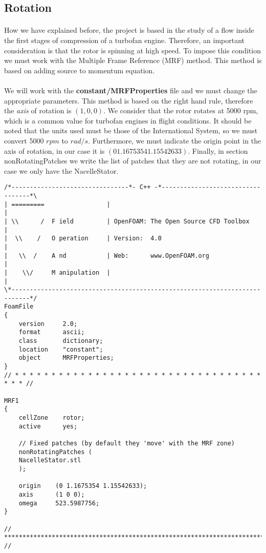 \subsection{Rotation}
\paragraph{}
How we have explained before, the project is based in the study of a flow inside the first stages of compression of a turbofan engine. Therefore, an important consideration is that the rotor is spinning at high speed. To impose this condition we must work with the Multiple Frame Reference (MRF) method. This method is based on adding source to momentum equation.

\paragraph{}
We will work with the \textbf{constant/MRFProperties} file and we must change the appropriate parameters. This method is based on the right hand rule, therefore the \textit{axis} of rotation is $(1,0,0)$. We consider that the rotor rotates at 5000 rpm, which is a common value for turbofan engines in flight conditions. It should be noted that the units used must be those of the International System, so we must convert 5000 $rpm$ to $rad/s$. Furthermore, we must indicate the origin point in the axis of rotation, in our case it is $(0 1.1675354 1.15542633)$. Finally, in section nonRotatingPatches we write the list of patches that they are not rotating, in our case we only have the NacelleStator.


\begin{footnotesize}
\begin{verbatim}
/*--------------------------------*- C++ -*----------------------------------*\
| =========                 |                                                 |
| \\      /  F ield         | OpenFOAM: The Open Source CFD Toolbox           |
|  \\    /   O peration     | Version:  4.0                                   |
|   \\  /    A nd           | Web:      www.OpenFOAM.org                      |
|    \\/     M anipulation  |                                                 |
\*---------------------------------------------------------------------------*/
FoamFile
{
    version     2.0;
    format      ascii;
    class       dictionary;
    location    "constant";
    object      MRFProperties;
}
// * * * * * * * * * * * * * * * * * * * * * * * * * * * * * * * * * * * * * //

MRF1
{
    cellZone    rotor;
    active      yes;

    // Fixed patches (by default they 'move' with the MRF zone)
    nonRotatingPatches (
	NacelleStator.stl
	);

    origin    (0 1.1675354 1.15542633);
    axis      (1 0 0);
    omega     523.5987756;
}

// ************************************************************************* //
\end{verbatim}
\end{footnotesize}
